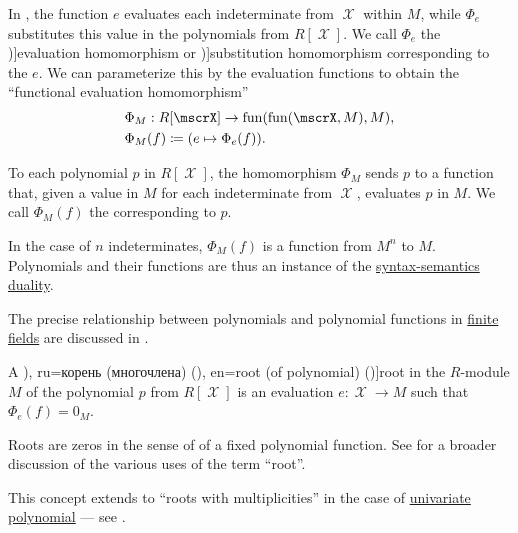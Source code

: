 \begin{concept}\label{con:evaluation_homomorphism}\mimprovised
  In , the function \( e \) evaluates each indeterminate from \( \mscrX \) within \( M \), while \( \Phi_e \) substitutes this value in the polynomials from \( R[\mscrX] \). We call \( \Phi_e \) the \term[en=evaluation homomorphism (\cite[98]{Lang2002Algebra})]{evaluation homomorphism} or \term[en=substitution homomorphism (\cite[151]{Knapp2016BasicAlgebra})]{substitution homomorphism} corresponding to the  \( e \). We can parameterize this by the evaluation functions to obtain the \enquote{functional evaluation homomorphism}
  \begin{equation*}
    \begin{aligned}
      &\Phi_M: R[\mscrX] \to \fun(\fun(\mscrX, M), M), \\
      &\Phi_M(f) \coloneqq (e \mapsto \Phi_e(f)).
    \end{aligned}
  \end{equation*}

  To each polynomial \( p \) in \( R[\mscrX] \), the homomorphism \( \Phi_M \) sends \( p \) to a function that, given a value in \( M \) for each indeterminate from \( \mscrX \), evaluates \( p \) in \( M \). We call \( \Phi_M(f) \) the  corresponding to \( p \).

  In the case of \( n \) indeterminates, \( \Phi_M(f) \) is a function from \( M^n \) to \( M \). Polynomials and their functions are thus an instance of the \hyperref[con:syntax_semantics_duality]{syntax-semantics duality}.

  The precise relationship between polynomials and polynomial functions in \hyperref[thm:finite_fields]{finite fields} are discussed in .
\end{concept}

\begin{definition}\label{def:root_of_polynomial}\mimprovised
  A \term[bg=корен (на уравнение) (\cite[2]{Обрешков1962ВисшаАлгебра}), ru=корень (многочлена) (\cite[99]{Винберг2014КурсАлгебры}), en=root (of polynomial) (\cite[281]{Aluffi2009Algebra})]{root} in the \( R \)-module \( M \) of the polynomial \( p \) from \( R[\mscrX] \) is an evaluation \( e: \mscrX \to M \) such that \( \Phi_e(f) = 0_M \).
\end{definition}
\begin{comments}
  \item Roots are zeros in the sense of  of a fixed polynomial function. See  for a broader discussion of the various uses of the term \enquote{root}.

  \item This concept extends to \enquote{roots with multiplicities} in the case of \hyperref[def:univariate_polynomial]{univariate polynomial} --- see .
\end{comments}

